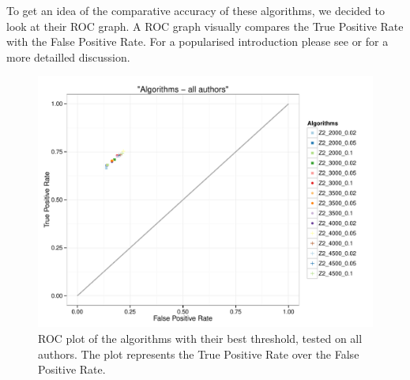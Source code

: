 \documentclass{article}\usepackage[]{graphicx}\usepackage[]{color}
\begin{document}
To get an idea of the comparative accuracy of these algorithms, we decided to look at their ROC graph. A ROC graph visually compares the True Positive Rate with the False Positive Rate. For a popularised introduction please see \autocite{Swets2008} or \autocite{Fawcett2006} for a more detailled discussion.
\begin{Schunk}
\begin{figure}
\includegraphics[width=\textwidth]{figures/theme-bestallauthorstable-1} \caption[ROC plot of the algorithms with their best threshold, tested on all authors]{ROC plot of the algorithms with their best threshold, tested on all authors. The plot represents the True Positive Rate over the False Positive Rate.}\label{fig:bestallauthorstable}
\end{figure}
\end{Schunk}
\end{document}
